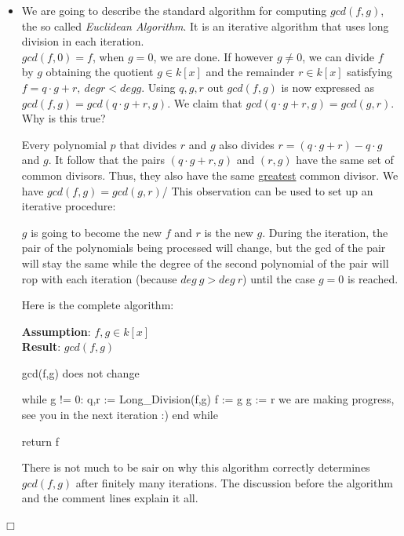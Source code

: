 \clearpage

\begin{proposition}[title = Proposition 1.5.7 (continued)]
    \begin{itemize}
      \item[(iii)] We are going to describe the standard algorithm for computing $gcd(f,g)$, the so called \textit{Euclidean Algorithm}. It is an iterative algorithm that uses long division in each iteration. \\[0.3em]
      $gcd(f, 0) = f$, when $g = 0$, we are done. 
      If however $g \neq 0$, we can divide $f$ by $g$ obtaining the quotient $g \in k[x]$ and the remainder $r \in k[x]$ satisfying $f = q \cdot g + r, \ deg r < deg g$.
      Using $q, g, r$ out $gcd(f, g)$ is now expressed as $gcd(f ,g) = gcd(q \cdot g + r, g)$. We claim that $gcd(q \cdot g + r, g) = gcd(g, r)$. \\[0.3em] 
      Why is this true? 

      Every polynomial $p$ that divides $r$ and $g$ also divides $r = (q \cdot g + r) - q \cdot g$ and $g$. It follow that the pairs $(q \cdot g + r, g)$ and $(r, g)$ have the 
      same set of common divisors. Thus, they also have the same \underline{greatest} common divisor. We have $gcd(f,g) = gcd(g, r)$/ This observation can be used to set up an iterative 
      procedure: 

      $g$ is going to become the new $f$ and $r$ is the new $g$. During the iteration, the pair of the polynomials being processed will change, but the gcd of the pair will stay the same 
      while the degree of the second polynomial of the pair will rop with each iteration (because $deg \ g > deg \ r$) until the case $g = 0$ is reached. 

      Here is the complete algorithm: 

      \begin{algorithm}[title = Greatest Common Divisor]
        \textbf{Assumption}: $f,g \in k[x]$  \\
        \textbf{Result}: $gcd(f,g)$ 
\begin{lstpseudo}
    gcd(f,g) does not change 

while g != 0: 
    q,r := Long_Division(f,g) 
    f := g 
    g := r 
        we are making progress, see you in the next iteration :) 
end while 

return f %
\end{lstpseudo}
    \end{algorithm}

      There is not much to be sair on why this algorithm correctly determines $gcd(f,g)$ after finitely many iterations. The discussion before the algorithm and the comment lines 
      explain it all.
    \end{itemize}
      \begin{flushright}
        $\Box $
      \end{flushright}
\end{proposition} 

